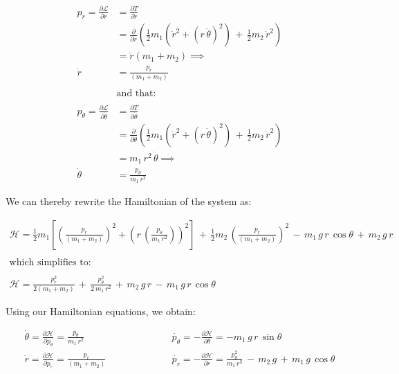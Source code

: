 \documentclass{article}
\begin{document}
\begin{align*}
p_{r} = \frac{\partial \mathscr{L}}{\partial \dot{r}} &= \frac{\partial T}{\partial \dot{r}} \\
&= \frac{\partial}{\partial \dot{r}} \left( \frac{1}{2}m_{1}\left( \dot{r}^{2} + (r\,\dot{\theta})^{2} \right) \,+\, \frac{1}{2}m_{2}\,\dot{r}^{2} \right) \\
&= \dot{r}(m_{1} +m_{2}) \implies \\
\dot{r} &= \frac{p_{r}}{(m_{1}+m_{2})} \\
\\
&\text{and that:} \\
\\
p_{\theta} = \frac{\partial \mathscr{L}}{\partial \dot{\theta}} &= \frac{\partial T}{\partial \dot{\theta}} \\
&= \frac{\partial}{\partial \dot{\theta}}\left( \frac{1}{2}m_{1}\left( \dot{r}^{2} + (r\,\dot{\theta})^{2} \right) \,+\, \frac{1}{2}m_{2}\,\dot{r}^{2} \right) \\
&= m_{1} \, r^{2} \, \dot{\theta} \implies \\
\dot{\theta} &= \frac{p_{\theta}}{m_{1}\,r^{2}}
\end{align*}

We can thereby rewrite the Hamiltonian of the system as:

\begin{gather*}
\mathscr{H} = \frac{1}{2}m_{1}\left[ \left(\frac{p_{r}}{(m_{1}+m_{2})}\right)^{2} + \left(r\,\left(\frac{p_{\theta}}{m_{1}\,r^{2}}\right)\right)^{2} \right] \,+\, \frac{1}{2}m_{2}\,\left(\frac{p_{r}}{(m_{1}+m_{2})}\right)^{2} \,-\, m_{1}\,g\,r\,\cos{\theta} \,+\, m_{2}\,g\,r \\
\\
\text{which simplifies to:} \\
\\
\mathscr{H} = \frac{p_{r}^{2}}{2(m_{1}+m_{2})} \,+\, \frac{p_{\theta}^{2}}{2\,m_{1}\,r^{2}} \,+\, m_{2}\,g\,r \,-\, m_{1}\,g\,r\,\cos{\theta}
\end{gather*}

Using our Hamiltonian equations, we obtain:

\begin{align*}
\dot{\theta} = \frac{\partial \mathscr{H}}{\partial p_{\theta}} = \frac{p_{\theta}}{m_{1}\,r^{2}} \qquad&\qquad\qquad \dot{p_{\theta}} = -\frac{\partial \mathscr{H}}{\partial \theta} = -m_{1}\,g\,r\,\sin{\theta} \\
\dot{r} = \frac{\partial \mathscr{H}}{\partial p_{r}} = \frac{p_{r}}{(m_{1}+m_{2})} \qquad&\qquad\qquad \dot{p_{r}} = -\frac{\partial \mathscr{H}}{\partial r} = \frac{p_{\theta}^{2}}{m_{1}\,r^{3}} \,-\, m_{2}\,g \,+\, m_{1}\,g\,\cos{\theta} \\
\end{align*}
\end{document}
